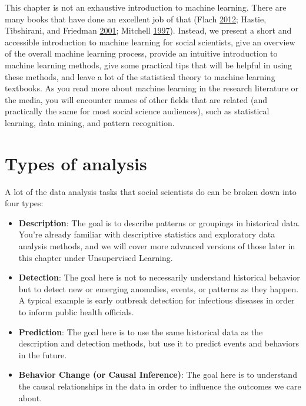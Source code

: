 \documentclass[]{krantz}
\begin{document}
This chapter is not an exhaustive introduction to machine learning.
There are many books that have done an excellent job of that (Flach
\protect\hyperlink{ref-Flach}{2012}; Hastie, Tibshirani, and Friedman
\protect\hyperlink{ref-HastieTibshirani}{2001}; Mitchell
\protect\hyperlink{ref-mitchell1997machine}{1997}). Instead, we present
a short and accessible introduction to machine learning for social
scientists, give an overview of the overall machine learning process,
provide an intuitive introduction to machine learning methods, give some
practical tips that will be helpful in using these methods, and leave a
lot of the statistical theory to machine learning textbooks. As you read
more about machine learning in the research literature or the media, you
will encounter names of other fields that are related (and practically
the same for most social science audiences), such as statistical
learning, data mining, and pattern recognition.

\section{Types of analysis}\label{types-of-analysis}

A lot of the data analysis tasks that social scientists do can be broken
down into four types:

\begin{itemize}
\item
  \textbf{Description}: The goal is to describe patterns or groupings in
  historical data. You're already familiar with descriptive statistics
  and exploratory data analysis methods, and we will cover more advanced
  versions of those later in this chapter under Unsupervised Learning.
\item
  \textbf{Detection}: The goal here is not to necessarily understand
  historical behavior but to detect new or emerging anomalies, events,
  or patterns as they happen. A typical example is early outbreak
  detection for infectious diseases in order to inform public health
  officials.
\item
  \textbf{Prediction}: The goal here is to use the same historical data
  as the description and detection methods, but use it to predict events
  and behaviors in the future.
\item
  \textbf{Behavior Change (or Causal Inference)}: The goal here is to
  understand the causal relationships in the data in order to influence
  the outcomes we care about.
\end{itemize}
\end{document}
